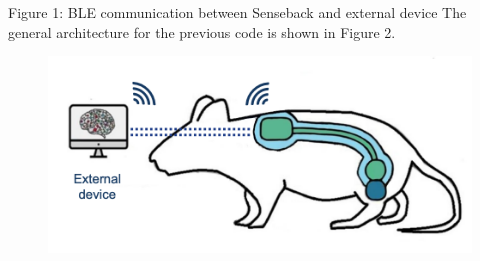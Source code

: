 \documentclass{Configuration_Files/PoliMi3i_thesis}
\begin{document}
Figure 1: BLE communication between Senseback and external device
The general architecture for the previous code is shown in Figure 2.

\begin{figure}[H]
	\includegraphics[scale=0.3]{prev2.png}
	\centering
\end{figure}
\end{document}
